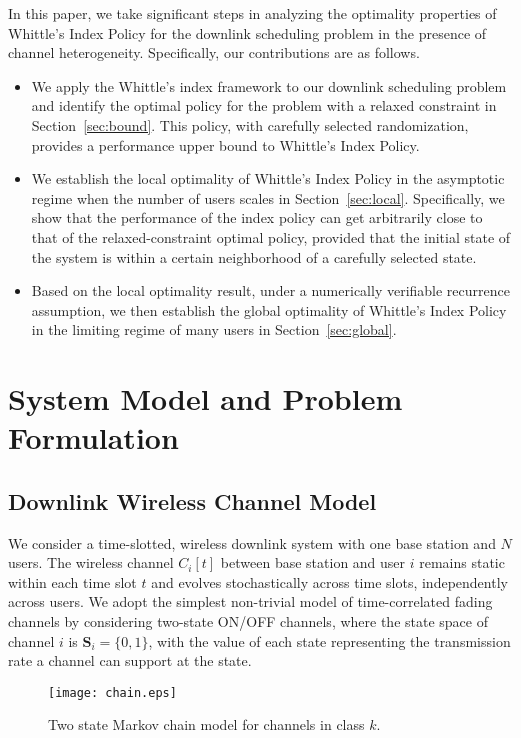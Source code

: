 \documentclass[11pt,twocolumn]{IEEEtran}
\begin{document}
In this paper, we take significant steps in analyzing the optimality
properties of Whittle's Index Policy for the downlink scheduling
problem in the presence of channel heterogeneity. Specifically, our contributions are as follows.

\begin{itemize}
\item We apply the Whittle's index framework to our downlink scheduling problem and identify the optimal policy for the problem with a relaxed constraint in Section~\ref{sec:bound}. This policy, with carefully selected randomization, provides a performance upper bound to Whittle's Index Policy.

\item We establish the local optimality of Whittle's Index Policy in the asymptotic regime when the number of users scales in Section~\ref{sec:local}. Specifically, we show that the performance of the index policy can get arbitrarily close to that of the relaxed-constraint optimal policy, provided that the initial state of the system is within a certain neighborhood of a carefully selected state.

\item Based on the local optimality result, under a numerically verifiable recurrence assumption, we then establish the global optimality of Whittle's Index Policy in the limiting regime of many users in Section~\ref{sec:global}.
\end{itemize}

\section{System Model and Problem Formulation}
\label{sec:model}

\subsection{Downlink Wireless Channel Model}

We consider a time-slotted, wireless downlink system with one base
station and $N$ users. The wireless channel $C_i[t]$ between base
station and user $i$ remains static within each time slot $t$ and
evolves stochastically across time slots, independently across
users. We adopt the simplest non-trivial model of time-correlated
fading channels by considering two-state ON/OFF channels, where the
state space of channel $i$ is $\mathcal{\bm S}_i=\{0, 1\}$, with
the value of each state representing the transmission rate a channel
can support at the state.
\begin{figure}
\centering
\texttt{[image: chain.eps]}
\caption{Two state Markov chain model for channels in class $k$.}
\label{fig:chain}
\end{figure}
\end{document}
